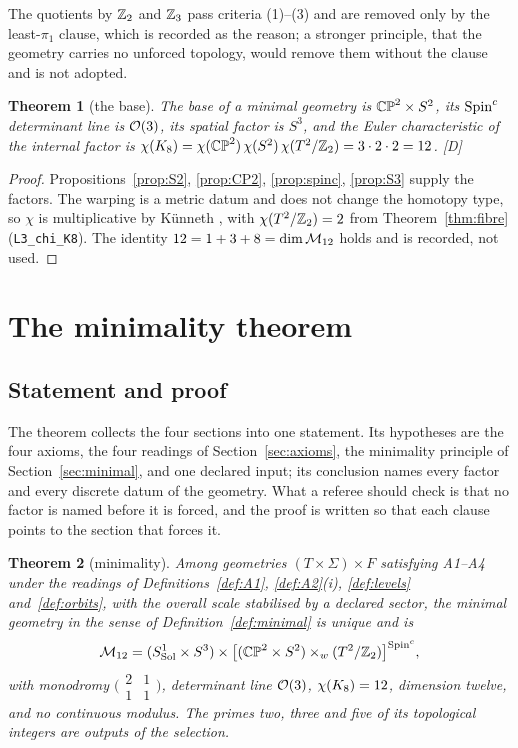 \documentclass[11pt,a4paper]{article}
\theoremstyle{plain}
\newtheorem{theorem}{Theorem}[section]
\theoremstyle{definition}
\theoremstyle{remark}
\newcommand{\Sol}{\mathrm{Sol}}
\newcommand{\rigD}{[\textup{D}]}
\begin{document}
The quotients by $\mathbb{Z}_{2}$ and $\mathbb{Z}_{3}$ pass criteria (1)--(3) and are removed only by the least-$\pi_{1}$ clause, which is recorded as the reason; a stronger principle, that the geometry carries no unforced topology, would remove them without the clause and is not adopted.

\begin{theorem}[the base]\label{thm:base}
The base of a minimal geometry is $\mathbb{CP}^2\times S^2$, its $\text{Spin}^c$ determinant line is $\mathcal{O}(3)$, its spatial factor is $S^{3}$, and the Euler characteristic of the internal factor is $\chi(K_8)=\chi(\mathbb{CP}^2)\,\chi(S^2)\,\chi(T^2/\mathbb{Z}_2)=3\cdot2\cdot2=12$. \rigD
\end{theorem}

\begin{proof}
Propositions~\ref{prop:S2}, \ref{prop:CP2}, \ref{prop:spinc}, \ref{prop:S3} supply the factors. The warping is a metric datum and does not change the homotopy type, so $\chi$ is multiplicative by K\"unneth \cite{Hatcher}, with $\chi(T^2/\mathbb{Z}_2)=2$ from Theorem~\ref{thm:fibre} (\texttt{L3\_chi\_K8}). The identity $12=1+3+8=\dim\mathcal{M}_{12}$ holds and is recorded, not used.
\end{proof}

\section{The minimality theorem}\label{sec:theorem}

\subsection{Statement and proof}

The theorem collects the four sections into one statement. Its hypotheses are the four axioms, the four readings of Section~\ref{sec:axioms}, the minimality principle of Section~\ref{sec:minimal}, and one declared input; its conclusion names every factor and every discrete datum of the geometry. What a referee should check is that no factor is named before it is forced, and the proof is written so that each clause points to the section that forces it.

\begin{theorem}[minimality]\label{thm:main}
Among geometries $(T\times\Sigma)\times F$ satisfying A1--A4 under the readings of Definitions~\ref{def:A1}, \ref{def:A2}(i), \ref{def:levels} and~\ref{def:orbits}, with the overall scale stabilised by a declared sector, the minimal geometry in the sense of Definition~\ref{def:minimal} is unique and is
\[
\Mtwelve=(S^{1}_{\Sol}\times S^{3})\times\bigl[(\CPtwo\times\Stwo)\times_{w}(\Ttwo/\Ztwo)\bigr]^{\Spinc},
\]
with monodromy $\bigl(\begin{smallmatrix}2&1\\1&1\end{smallmatrix}\bigr)$, determinant line $\mathcal{O}(3)$, $\chi(K_8)=12$, dimension twelve, and no continuous modulus. The primes two, three and five of its topological integers are outputs of the selection.
\end{theorem}
\end{document}
